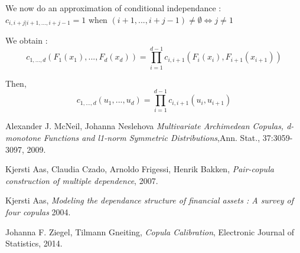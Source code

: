 \documentclass{article}
\begin{document}
	We now do an approximation of conditional independance : \newline
	\begin{math} c_{i,i+j|i+1,...,i+j-1}=1 \end{math} when \begin{math} (i+1,...,i+j-1) \neq \emptyset \Leftrightarrow j\neq 1\end{math}

	We obtain :\newline
	\begin{equation*}
		c_{1,...,d}(F_1(x_1),...,F_d(x_d)) = \prod_{i=1}^{d-1} c_{i,i+1} (F_i(x_i),F_{i+1}(x_{i+1}))
	\end{equation*}

	Then,
	\begin{equation*}
		c_{1,...,d}(u_1,...,u_d) = \prod_{i=1}^{d-1} c_{i,i+1} (u_i,u_{i+1})
	\end{equation*}


\begin{thebibliography}{9}

  	Alexander J. McNeil, Johanna Neslehova
 	 \emph{Multivariate Archimedean Copulas, d-monotone Functions and l1-norm Symmetric Distributions},Ann. Stat., 37:3059-3097, 2009.

  	Kjersti Aas, Claudia Czado, Arnoldo Frigessi, Henrik Bakken,
 	 \emph{Pair-copula construction of multiple dependence},
  	2007.

  	Kjersti Aas,
 	 \emph{Modeling the dependance structure of financial assets : A survey of four copulas}
  	2004.

  	Johanna F. Ziegel, Tilmann Gneiting,
 	 \emph{Copula Calibration}, Electronic Journal of Statistics,
  	2014.

	\end{thebibliography}
\end{document}
